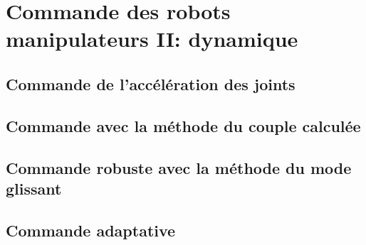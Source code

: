 \chapter{Commande des robots manipulateurs II: dynamique}


\section{Commande de l'accélération des joints}

\section{Commande avec la méthode du couple calculée}

\section{Commande robuste avec la méthode du mode glissant}

\section{Commande adaptative}